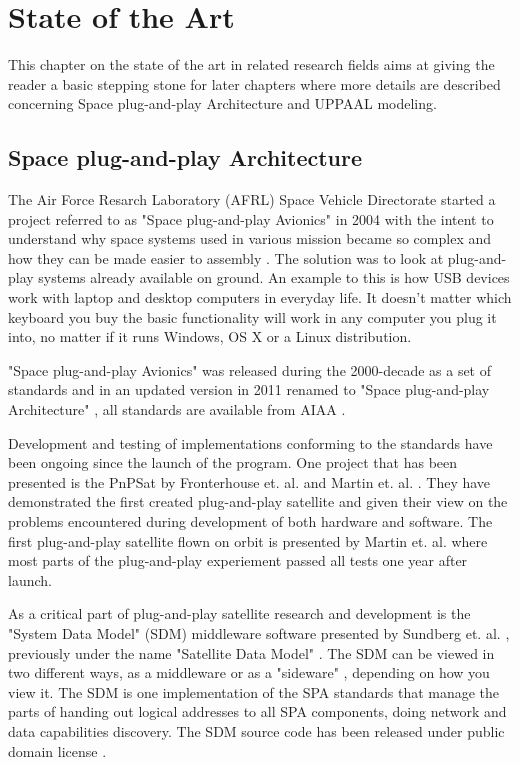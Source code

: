 \chapter{State of the Art} \label{ch:state_of_the_art}
This chapter on the state of the art in related research fields aims at giving
the reader a basic stepping stone for later chapters where more details are
described concerning Space plug-and-play Architecture and UPPAAL modeling.

\section{Space plug-and-play Architecture}
The Air Force Resarch Laboratory (AFRL) Space Vehicle Directorate started a
project referred to as "Space plug-and-play Avionics" in 2004 with the intent
to understand why space systems used in various mission became so complex and
how they can be made easier to assembly \cite{fronterhouse2007, martin2012}.
The solution was to look at plug-and-play systems already available on ground.
An example to this is how USB devices work with laptop and desktop computers in
everyday life. It doesn't matter which keyboard you buy the basic functionality
will work in any computer you plug it into, no matter if it runs Windows, OS X
or a Linux distribution.

"Space plug-and-play Avionics" was released during the 2000-decade as a set of
standards and in an updated version in 2011 renamed to "Space plug-and-play
Architecture" \cite{martin2012}, all standards are available from AIAA
\cite{spa:all}.


Development and testing of implementations conforming to the standards have
been ongoing since the launch of the program. One project that has been
presented is the PnPSat by Fronterhouse et. al. \cite{fronterhouse2007} and
Martin et. al. \cite{martin2008}. They have demonstrated the first created
plug-and-play satellite and given their view on the problems encountered during
development of both hardware and software. The first plug-and-play satellite
flown on orbit is presented by Martin et. al. \cite{martin2012} where most
parts of the plug-and-play experiement passed all tests one year after launch.

As a critical part of plug-and-play satellite research and development is the
"System Data Model" (SDM) middleware software presented by Sundberg et. al.
\cite{sundberg2006}, previously under the name "Satellite Data Model"
\cite{spa:sdm-source}. The SDM can be viewed in two different ways, as a
middleware or as a "sideware" \cite{fronterhouse2007}, depending on how you
view it. The SDM is one implementation of the SPA standards that manage the
parts of handing out logical addresses to all SPA components, doing network and
data capabilities discovery. The SDM source code has been released under public
domain license \cite{spa:sdm-source}.

